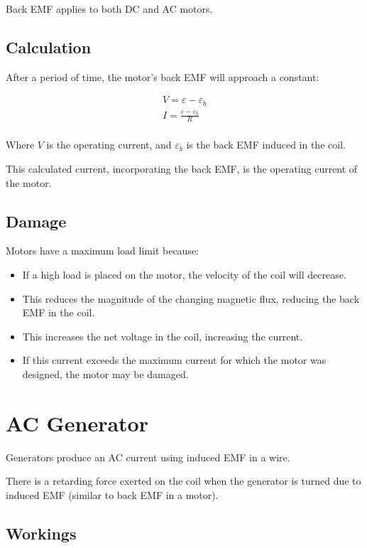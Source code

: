 \documentclass[a4paper,11pt]{report}
\begin{document}
Back EMF applies to both DC and AC motors.

\subsection{Calculation}

After a period of time, the motor's back EMF will approach a constant:

$$
\begin{aligned}
V = \varepsilon - \varepsilon_b \\
I = \frac{\varepsilon - \varepsilon_b}{R} \\
\end{aligned}
$$

Where $V$ is the operating current, and $\varepsilon_b$ is the back EMF
induced in the coil.

This calculated current, incorporating the back EMF, is the operating current
of the motor.

\subsection{Damage}

Motors have a maximum load limit because:

\begin{itemize}
\item If a high load is placed on the motor, the velocity of the coil will
	decrease.
\item This reduces the magnitude of the changing magnetic flux, reducing the
	back EMF in the coil.
\item This increases the net voltage in the coil, increasing the current.
\item If this current exceeds the maximum current for which the motor was
	designed, the motor may be damaged.
\end{itemize}


\section{AC Generator}

Generators produce an AC current using induced EMF in a wire.

There is a retarding force exerted on the coil when the generator is turned due
to induced EMF (similar to back EMF in a motor).

\subsection{Workings}
\end{document}
